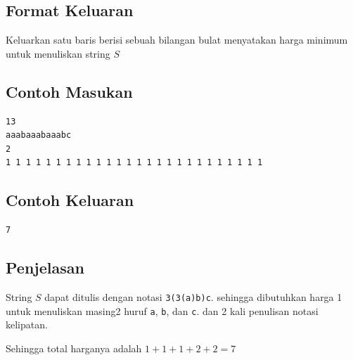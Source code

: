 \documentclass{article}
\begin{document}
\subsection*{Format Keluaran}
Keluarkan satu baris berisi sebuah bilangan bulat menyatakan harga minimum untuk menuliskan string $S$

\subsection*{Contoh Masukan}
\begin{lstlisting}
13
aaabaaabaaabc
2
1 1 1 1 1 1 1 1 1 1 1 1 1 1 1 1 1 1 1 1 1 1 1 1 1 1
\end{lstlisting}

\subsection*{Contoh Keluaran}
\begin{lstlisting}
7
\end{lstlisting}

\subsection*{Penjelasan}
String $S$ dapat ditulis dengan notasi \lstinline|3(3(a)b)c|. sehingga dibutuhkan harga 1 
untuk menuliskan masing2 huruf \lstinline|a|, \lstinline|b|, dan \lstinline|c|. dan 2 kali penulisan notasi kelipatan.

Sehingga total harganya adalah $1 + 1 + 1 + 2 + 2 = 7$
\end{document}
